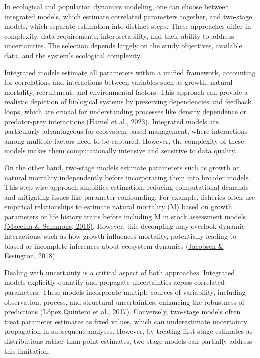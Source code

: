 \documentclass[
]{book}
\begin{document}
In ecological and population dynamics modeling, one can choose between integrated models, which estimate correlated parameters together, and two-stage models, which separate estimation into distinct steps. These approaches differ in complexity, data requirements, interpretability, and their ability to address uncertainties. The selection depends largely on the study objectives, available data, and the system's ecological complexity.

Integrated models estimate all parameters within a unified framework, accounting for correlations and interactions between variables such as growth, natural mortality, recruitment, and environmental factors. This approach can provide a realistic depiction of biological systems by preserving dependencies and feedback loops, which are crucial for understanding processes like density dependence or predator-prey interactions \href{https://typeset.io/papers/natural-mortality-theory-estimation-and-application-in-29k3o1na}{(Hamel et al., 2023)}. Integrated models are particularly advantageous for ecosystem-based management, where interactions among multiple factors need to be captured. However, the complexity of these models makes them computationally intensive and sensitive to data quality.

On the other hand, two-stage models estimate parameters such as growth or natural mortality independently before incorporating them into broader models. This step-wise approach simplifies estimation, reducing computational demands and mitigating issues like parameter confounding. For example, fisheries often use empirical relationships to estimate natural mortality (M) based on growth parameters or life history traits before including M in stock assessment models \href{https://typeset.io/papers/assessing-the-accuracy-of-published-natural-mortality-2ejiyrxpk7}{(Maceina \& Sammons, 2016)}. However, this decoupling may overlook dynamic interactions, such as how growth influences mortality, potentially leading to biased or incomplete inferences about ecosystem dynamics \href{https://typeset.io/papers/natural-mortality-augments-population-fluctuations-of-forage-11krhr78za}{(Jacobsen \& Essington, 2018)}.

Dealing with uncertainty is a critical aspect of both approaches. Integrated models explicitly quantify and propagate uncertainties across correlated parameters. These models incorporate multiple sources of variability, including observation, process, and structural uncertainties, enhancing the robustness of predictions \href{https://typeset.io/papers/incorporating-uncertainty-into-a-length-based-estimator-of-4bes19tqua}{(López Quintero et al., 2017)}. Conversely, two-stage models often treat parameter estimates as fixed values, which can underestimate uncertainty propagation in subsequent analyses. However, by treating first-stage estimates as distributions rather than point estimates, two-stage models can partially address this limitation.
\end{document}

